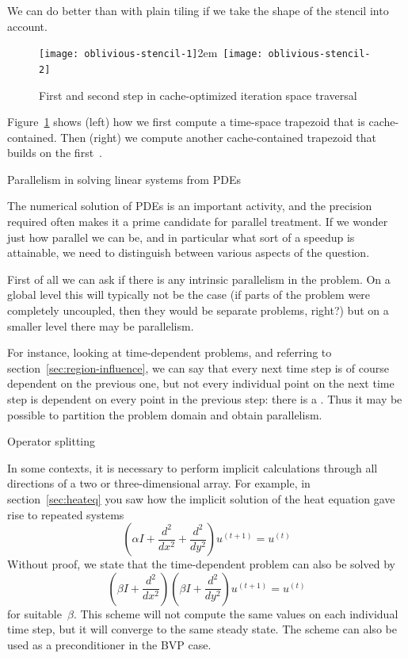 We can do better than with plain tiling if we take the shape of the
stencil into account.
\begin{figure}[ht]
  \hbox{\texttt{[image: oblivious-stencil-1]}\kern2em\relax
    \texttt{[image: oblivious-stencil-2]}}
  \caption{First and second step in cache-optimized iteration space
    traversal}
  \label{fig:oblivious-cache}
\end{figure}
Figure~\ref{fig:oblivious-cache} shows (left) how we first compute a
time-space trapezoid that is cache-contained. Then (right) we compute
another cache-contained trapezoid that builds on the
first~\cite{Frigo:2007:oblivious-stencil}.

 {Parallelism in solving linear systems from \acp{PDE}}

The numerical solution of \acp{PDE} is an important activity,
and the precision required often makes it a prime candidate for
parallel treatment. If we wonder just how parallel we can be,
and in particular what sort of a speedup is attainable,
we need to distinguish between various aspects of the question.

First of all we can ask if there is any intrinsic parallelism
in the problem. On a global level this will typically not be the case
(if parts of the problem were completely uncoupled, then they would be
separate problems, right?) but on a smaller level there may be
parallelism. 

For instance, looking at time-dependent problems, and referring to
section~\ref{sec:region-influence}, we can say that every next time
step is of course dependent on the previous one, but not every
individual point on the next time step is dependent on every point in
the previous step: there is a . 
Thus it may be possible to partition the problem domain and
obtain parallelism.

 {Operator splitting}

In some contexts, it is necessary to perform implicit calculations
through all directions of a two or three-dimensional array. For
example, in section~\ref{sec:heateq} you saw how the implicit solution
of the heat equation
gave rise to repeated systems
\begin{equation}
  (\alpha I+\frac {d^2}{dx^2}+\frac{d^2}{dy^2})u^{(t+1)}=u^{(t)}
  \label{eq:heat-recap}
\end{equation}
Without proof, we state that the time-dependent problem can also be solved by
\begin{equation}
  (\beta I+\frac {d^2}{dx^2})(\beta I+\frac{d^2}{dy^2})u^{(t+1)}=u^{(t)}
  \label{eq:adi-recap}
\end{equation}
for suitable~$\beta$. This scheme will not compute the same
values on each individual time step, but it will converge to the same
steady state. The scheme can also be used as a preconditioner in the
\ac{BVP} case.

